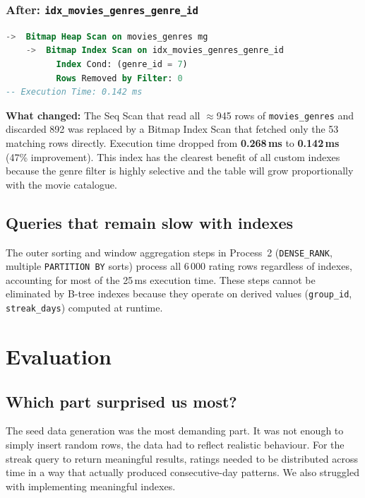 \documentclass[11pt, a4paper]{article}
\begin{document}
\subsubsection*{After: \texttt{idx\_movies\_genres\_genre\_id}}

\begin{lstlisting}[language=SQL, caption={After index --- genre filter on movies\_genres}]
->  Bitmap Heap Scan on movies_genres mg
    ->  Bitmap Index Scan on idx_movies_genres_genre_id
          Index Cond: (genre_id = 7)
          Rows Removed by Filter: 0
-- Execution Time: 0.142 ms
\end{lstlisting}

\noindent\textbf{What changed:} The Seq Scan that read all $\approx$945
rows of \texttt{movies\_genres} and discarded 892 was replaced by a
Bitmap Index Scan that fetched only the 53 matching rows directly.
Execution time dropped from \textbf{0.268\,ms} to \textbf{0.142\,ms}
(47\% improvement). This index has the clearest benefit of all custom
indexes because the genre filter is highly selective and the table will
grow proportionally with the movie catalogue.

\subsection{Queries that remain slow with indexes}

The outer sorting and window aggregation steps in Process~2
(\texttt{DENSE\_RANK}, multiple \texttt{PARTITION BY} sorts) process all
6\,000 rating rows regardless of indexes, accounting for most of the
25\,ms execution time. These steps cannot be eliminated by B-tree indexes
because they operate on derived values (\texttt{group\_id},
\texttt{streak\_days}) computed at runtime.

\newpage
\section{Evaluation}
\label{sec:evaluation}

\subsection*{Which part surprised us most?}

The seed data generation was the most demanding part. It was not enough to
simply insert random rows, the data had to reflect realistic behaviour.
For the streak query to return meaningful results, ratings needed to be
distributed across time in a way that actually produced consecutive-day
patterns. We also struggled with implementing meaningful indexes.
\end{document}
